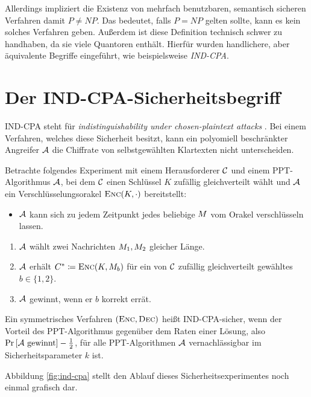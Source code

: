 Allerdings impliziert die Existenz von mehrfach benutzbaren, semantisch
sicheren Verfahren damit $P \neq NP$. Das bedeutet, falls $P = NP$
gelten sollte, kann es kein solches Verfahren geben. Außerdem ist diese
Definition technisch schwer zu handhaben, da sie viele Quantoren
enthält. Hierfür wurden handlichere, aber äquivalente Begriffe
eingeführt, wie beispielsweise \emph{IND-CPA}.

\section{Der IND-CPA-Sicherheitsbegriff}\label{sec:ind-cpa} IND-CPA
steht für \emph{indistinguishability under chosen-plaintext attacks}
\indexINDCPA. Bei einem Verfahren, welches diese Sicherheit besitzt,
kann ein polyomiell beschränkter Angreifer $\mathcal{A}$ die Chiffrate von
selbstgewählten Klartexten nicht unterscheiden.
\begin{definition} Betrachte folgendes Experiment
  mit einem Herausforderer $\mathcal{C}$ und einem PPT-Algorithmus $\mathcal{A}$, bei dem
  $\mathcal{C}$ einen Schlüssel $K$ zufällig gleichverteilt wählt und $\mathcal{A}$ ein
  Verschlüsselungsorakel $\textsc{Enc}(K,\cdot)$ bereitstellt:
  \begin{itemize}
  \item $\mathcal{A}$ kann sich zu jedem Zeitpunkt jedes beliebige
    $M$ vom Orakel verschlüsseln lassen.
  \end{itemize}
  \begin{enumerate}
  \item $\mathcal{A}$ wählt zwei Nachrichten $M_1, M_2$
    gleicher Länge.
  \item $\mathcal{A}$ erhält $C^{*} \coloneqq \textsc{Enc}(K,
    M_{b})$ für ein von $\mathcal{C}$ zufällig gleichverteilt gewähltes $b \in
    \{1, 2\}$.
  \item $\mathcal{A}$ gewinnt, wenn er $b$ korrekt errät.
  \end{enumerate} Ein symmetrisches Verfahren $(\textsc{Enc}, \textsc{Dec})$ heißt
  IND-CPA-sicher, wenn der Vorteil des PPT-Algorithmus gegenüber dem Raten
  einer Lösung, also $\Pr \left[ \mathcal{A} \textnormal{ gewinnt} \right] -
  \frac{1}{2}$, für alle PPT-Algorithmen $\mathcal{A}$ vernachlässigbar im
  Sicherheitsparameter $k$ ist.
\end{definition} Abbildung \ref{fig:ind-cpa} stellt den Ablauf dieses
Sicherheitsexperimentes noch einmal grafisch dar.

